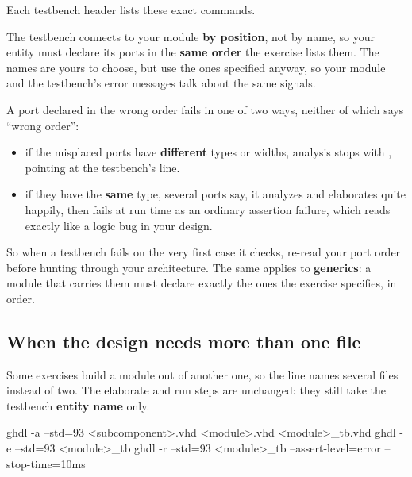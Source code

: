 \noindent Each testbench header lists these exact commands.

The testbench connects to your module \textbf{by position}, not by name, so your entity must declare
its ports in the \textbf{same order} the exercise lists them. The names are yours to choose, but use
the ones specified anyway, so your module and the testbench's error messages talk about the same
signals.

A port declared in the wrong order fails in one of two ways, neither of which says ``wrong order'':
\begin{itemize}
  \item if the misplaced ports have \textbf{different} types or widths, analysis stops with
    , pointing at the testbench's  line.
  \item if they have the \textbf{same} type, several  ports say, it analyzes and
    elaborates quite happily, then fails at run time as an ordinary assertion failure, which reads
    exactly like a logic bug in your design.
\end{itemize}
So when a testbench fails on the very first case it checks, re-read your port order before hunting
through your architecture. The same applies to \textbf{generics}: a module that carries them must
declare exactly the ones the exercise specifies, in order.

\subsection{When the design needs more than one file}
\label{c2:c5}
Some exercises build a module out of another one, so the  line names several files
instead of two. The elaborate and run steps are unchanged: they still take the testbench
\textbf{entity name} only.

\begin{shell}
ghdl -a --std=93 <subcomponent>.vhd <module>.vhd <module>_tb.vhd
ghdl -e --std=93 <module>_tb
ghdl -r --std=93 <module>_tb --assert-level=error --stop-time=10ms
\end{shell}

